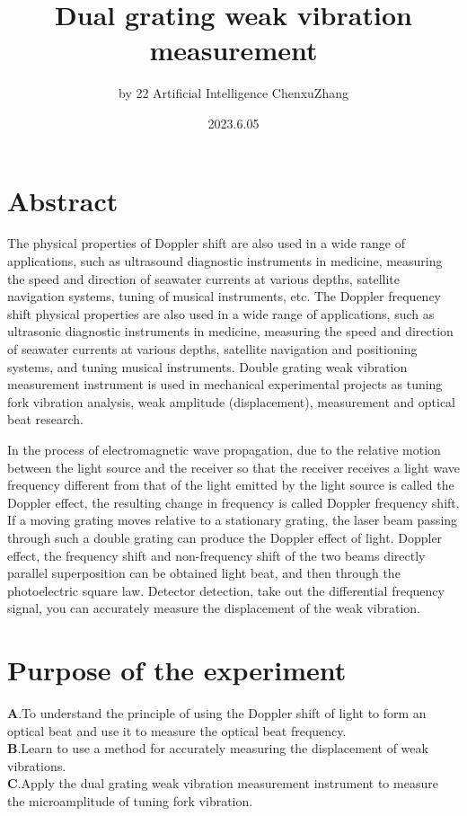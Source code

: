 \documentclass[UTF8]{article}
\title{Dual grating weak vibration measurement}
\author{by 22 Artificial Intelligence ChenxuZhang}
\date{2023.6.05}
\begin{document}
	
	\fancyfoot[C]{\thepage}
	
	\maketitle
	\tableofcontents
	\newpage
	
	\section{Abstract}
 The physical properties of Doppler shift are also used in a wide range of applications, such as ultrasound diagnostic instruments in medicine, measuring the speed and direction of seawater currents at various depths, satellite navigation systems, tuning of musical instruments, etc. The Doppler frequency shift physical properties are also used in a wide range of applications, such as ultrasonic diagnostic instruments in medicine, measuring the speed and direction of seawater currents at various depths, satellite navigation and positioning systems, and tuning musical instruments. Double grating weak vibration measurement instrument is used in mechanical experimental projects as tuning fork vibration analysis, weak amplitude (displacement), measurement and optical beat research.

In the process of electromagnetic wave propagation, due to the relative motion between the light source and the receiver so that the receiver receives a light wave frequency different from that of the light emitted by the light source is called the Doppler effect, the resulting change in frequency is called Doppler frequency shift. If a moving grating moves relative to a stationary grating, the laser beam passing through such a double grating can produce the Doppler effect of light. Doppler effect, the frequency shift and non-frequency shift of the two beams directly parallel superposition can be obtained light beat, and then through the photoelectric square law. Detector detection, take out the differential frequency signal, you can accurately measure the displacement of the weak vibration.
 
	
\section{Purpose of the experiment}
   $\bm{A}$.To understand the principle of using the Doppler shift of light to form an optical beat and use it to measure the optical beat frequency.\\
   $\bm{B}$.Learn to use a method for accurately measuring the displacement of weak vibrations.\\
   $\bm{C}$.Apply the dual grating weak vibration measurement instrument to measure the microamplitude of tuning fork vibration.
\end{document}
